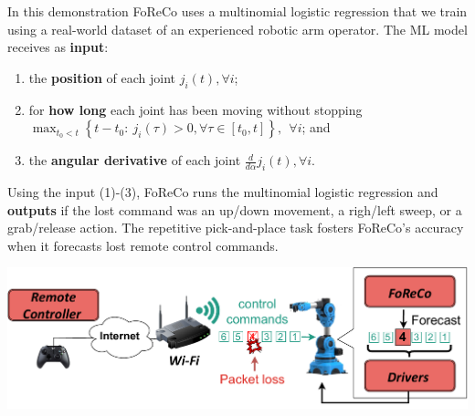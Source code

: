 \documentclass[a0,portrait]{a0poster}
\begin{document}
\begin{multicols}{2}
In this demonstration
FoReCo uses a multinomial 
logistic regression that we
train using a real-world dataset
of an experienced
robotic arm operator.
The
ML model
receives as \textbf{input}:
\begin{enumerate}
    \item the \textbf{position} of each joint $j_i(t), \forall i$;
    \item for \textbf{how long} each joint has
    been moving without stopping\\
    $\max_{t_0<t}\left\{t-t_0:\ j_i(\tau)>0, \forall\tau\in[t_0,t]\right\},\ \ \forall i$; and
    \item the \textbf{angular derivative} of each joint $\tfrac{d}{d\alpha}j_i(t), \forall i$.
\end{enumerate}
Using the input (1)-(3),
FoReCo runs the multinomial logistic
regression and \textbf{outputs}
if the lost command
was an up/down movement,
a righ/left sweep, 
or a grab/release action.
The repetitive pick-and-place task
fosters FoReCo's accuracy
when it forecasts lost remote
control commands.



\begin{center}\vspace{1cm}
    \includegraphics[width=\linewidth]{figures/experimental-setup-standalone.pdf}
    \label{fig:foreco}
\end{center}\vspace{1cm}








\end{multicols}
\end{document}

